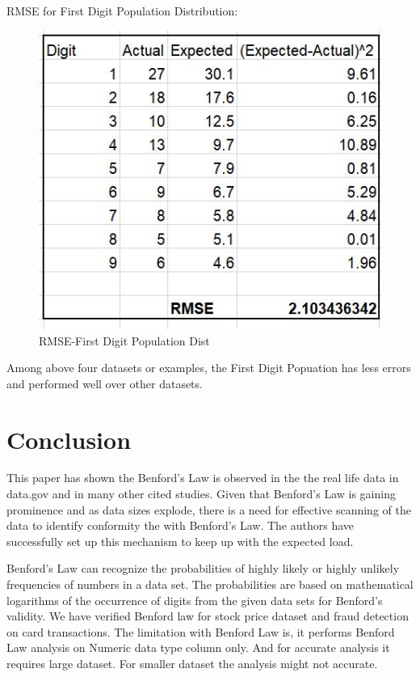 RMSE for First Digit Population Distribution:
\begin{figure}[!ht]
\centering\includegraphics[width=\columnwidth]{images/rmse_f_pop.JPG}
  \caption{RMSE-First Digit Population Dist}\label{f:rmse-f-pop}
\end{figure}

Among above four datasets or examples, the First Digit Popuation
has less errors and performed well over other datasets.

\section{Conclusion}
This paper has shown the Benford’s Law is observed in 
the the real life data in data.gov and in many other 
cited studies. Given that Benford’s Law is gaining prominence 
and as data sizes explode, there is a need for effective scanning
of the data to identify conformity the with Benford’s Law. 
The authors have successfully set up this mechanism to 
keep up with the expected load.


Benford’s Law can recognize the probabilities of highly  
likely or highly unlikely frequencies of numbers in a data set.
The probabilities are based on mathematical logarithms of the 
occurrence of digits from the given data sets for Benford's 
validity. We have verified Benford law for stock price 
dataset and fraud detection on card transactions.
The limitation with Benford Law is, it performs 
Benford Law analysis on Numeric data type column only. 
And for accurate analysis it requires large dataset. 
For smaller dataset the analysis might not accurate.


